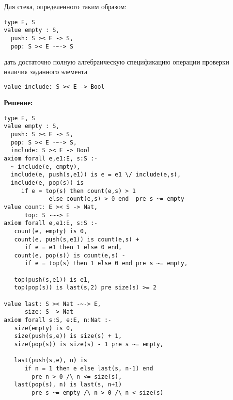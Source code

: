 

\z Для стека, определенного таким образом:
\begin{lstlisting}
type E, S
value empty : S,
  push: S >< E -> S,
  pop: S >< E -~-> S
\end{lstlisting}
дать достаточно полную алгебраическую спецификацию операции проверки наличия заданного элемента
\begin{lstlisting}
value include: S >< E -> Bool
\end{lstlisting}

\textbf{Решение:}
\begin{lstlisting}
type E, S
value empty : S,
  push: S >< E -> S,
  pop: S >< E -~-> S,
  include: S >< E -> Bool
axiom forall e,e1:E, s:S :-
  ~ include(e, empty),
  include(e, push(s,e1)) is e = e1 \/ include(e,s),
  include(e, pop(s)) is
     if e = top(s) then count(e,s) > 1
             else count(e,s) > 0 end  pre s ~= empty
value count: E >< S -> Nat,
      top: S -~-> E
axiom forall e,e1:E, s:S :-
   count(e, empty) is 0,
   count(e, push(s,e1)) is count(e,s) +
      if e = e1 then 1 else 0 end,
   count(e, pop(s)) is count(e,s) -
      if e = top(s) then 1 else 0 end pre s ~= empty,

   top(push(s,e1)) is e1,
   top(pop(s)) is last(s,2) pre size(s) >= 2

value last: S >< Nat -~-> E,
      size: S -> Nat
axiom forall s:S, e:E, n:Nat :-
   size(empty) is 0,
   size(push(s,e)) is size(s) + 1,
   size(pop(s)) is size(s) - 1 pre s ~= empty,

   last(push(s,e), n) is
      if n = 1 then e else last(s, n-1) end
        pre n > 0 /\ n <= size(s),
   last(pop(s), n) is last(s, n+1)
        pre s ~= empty /\ n > 0 /\ n < size(s)
\end{lstlisting}

